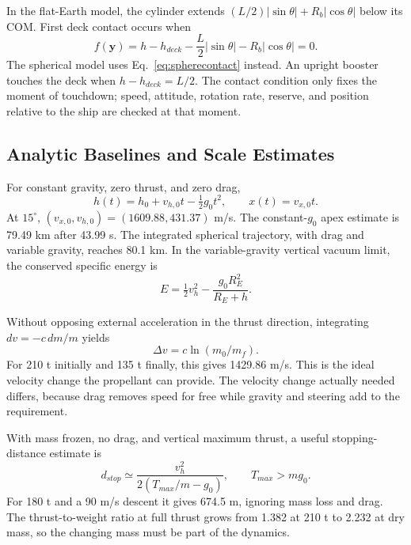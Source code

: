 In the flat-Earth model, the cylinder extends $(L/2)|\sin\theta|+R_b|\cos\theta|$ below its COM. First deck contact occurs when
\begin{equation}\label{eq:contact}
 f(\mathbf y)=h-h_{deck}-\frac L2|\sin\theta|-R_b|\cos\theta|=0.
\end{equation}
The spherical model uses Eq.~\eqref{eq:spherecontact} instead. An upright booster touches the deck when $h-h_{deck}=L/2$. The contact condition only fixes the moment of touchdown; speed, attitude, rotation rate, reserve, and position relative to the ship are checked at that moment.

\subsection{Analytic Baselines and Scale Estimates}
For constant gravity, zero thrust, and zero drag,
\begin{equation}
 h(t)=h_0+v_{h,0}t-\tfrac12g_0t^2,\qquad x(t)=v_{x,0}t.
\end{equation}
At $15^\circ$, $(v_{x,0},v_{h,0})=(1609.88,431.37)$ m/s. The constant-$g_0$ apex estimate is 79.49 km after 43.99 s. The integrated spherical trajectory, with drag and variable gravity, reaches 80.1 km. In the variable-gravity vertical vacuum limit, the conserved specific energy is
\begin{equation}
 E=\tfrac12v_h^2-\frac{g_0R_E^2}{R_E+h}.
\end{equation}

Without opposing external acceleration in the thrust direction, integrating $dv=-c\,dm/m$ yields
\begin{equation}\label{eq:rocket}
 \Delta v=c\ln(m_0/m_f).
\end{equation}
For 210 t initially and 135 t finally, this gives 1429.86 m/s. This is the ideal velocity change the propellant can provide. The velocity change actually needed differs, because drag removes speed for free while gravity and steering add to the requirement.

With mass frozen, no drag, and vertical maximum thrust, a useful stopping-distance estimate is
\begin{equation}
 d_{stop}\simeq\frac{v_h^2}{2(T_{max}/m-g_0)},\qquad T_{max}>mg_0.
\end{equation}
For 180 t and a 90 m/s descent it gives 674.5 m, ignoring mass loss and drag. The thrust-to-weight ratio at full thrust grows from 1.382 at 210 t to 2.232 at dry mass, so the changing mass must be part of the dynamics.

